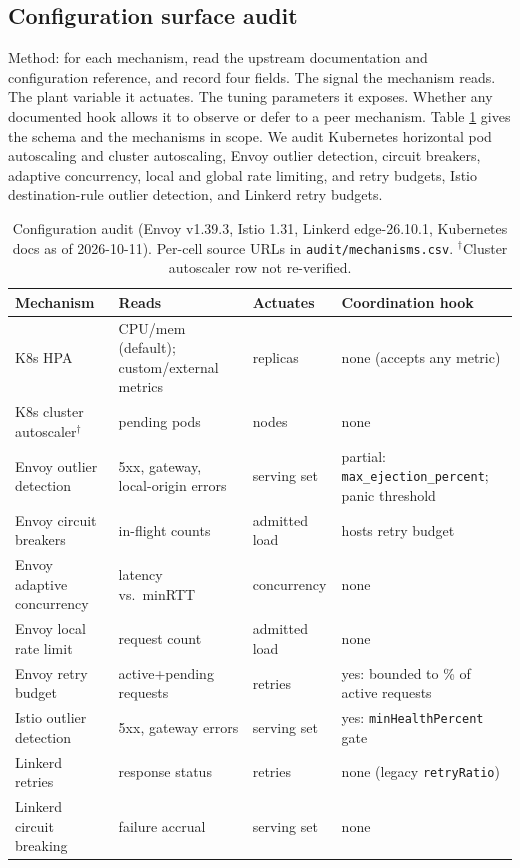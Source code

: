 \documentclass[conference]{IEEEtran}
\begin{document}
\subsection{Configuration surface audit}

Method: for each mechanism, read the upstream documentation and
configuration reference, and record four fields. The signal the mechanism
reads. The plant variable it actuates. The tuning parameters it exposes.
Whether any documented hook allows it to observe or defer to a peer
mechanism. Table \ref{tab:audit} gives the schema and the mechanisms in
scope. We audit Kubernetes horizontal pod autoscaling and cluster
autoscaling, Envoy outlier detection, circuit breakers, adaptive concurrency,
local and global rate limiting, and retry budgets, Istio destination-rule
outlier detection, and Linkerd retry budgets.

\begin{table}[t]
\caption{Configuration audit (Envoy v1.39.3, Istio 1.31, Linkerd edge-26.10.1, Kubernetes docs as of 2026-10-11). Per-cell source URLs in \texttt{audit/mechanisms.csv}. $^\dagger$Cluster autoscaler row not re-verified.}
\label{tab:audit}
\centering
\footnotesize
\begin{tabular}{@{}lp{4.2cm}lp{5.2cm}@{}}
\toprule
Mechanism & Reads & Actuates & Coordination hook \\
\midrule
K8s HPA & CPU/mem (default); custom/external metrics & replicas & none (accepts any metric) \\
K8s cluster autoscaler$^\dagger$ & pending pods & nodes & none \\
Envoy outlier detection & 5xx, gateway, local-origin errors & serving set & partial: \texttt{max\_ejection\_percent}; panic threshold \\
Envoy circuit breakers & in-flight counts & admitted load & hosts retry budget \\
Envoy adaptive concurrency & latency vs.\ minRTT & concurrency & none \\
Envoy local rate limit & request count & admitted load & none \\
Envoy retry budget & active+pending requests & retries & yes: bounded to \% of active requests \\
Istio outlier detection & 5xx, gateway errors & serving set & yes: \texttt{minHealthPercent} gate \\
Linkerd retries & response status & retries & none (legacy \texttt{retryRatio}) \\
Linkerd circuit breaking & failure accrual & serving set & none \\
\bottomrule
\end{tabular}
\end{table}
\end{document}
